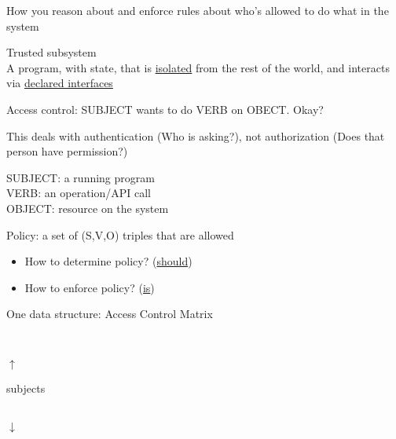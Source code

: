 How you reason about and enforce rules about who's allowed to do what in the
system

\begin{definition}{Trusted subsystem}\\
A program, with state, that is \underline{isolated} from
the rest of the world, and interacts via \underline{declared interfaces}
\end{definition}

Access control: SUBJECT wants to do VERB on OBECT. Okay?

This deals with authentication (Who is asking?), not authorization (Does that
person have permission?)

SUBJECT: a running program\\
VERB: an operation/API call\\
OBJECT: resource on the system

Policy: a set of (S,V,O) triples that are allowed
\begin{itemize}
    \item How to determine policy? (\underline{should})
    \item How to enforce policy? (\underline{is})
\end{itemize}
One data structure: Access Control Matrix\\
\parbox[c]{5cm}{\\
\parbox[c]{1cm}{$\uparrow$\\
\begin{sideways}subjects\end{sideways}\\
$\downarrow$}
\makebox[.5cm]{}
}

